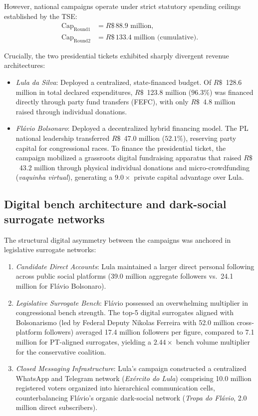 \documentclass[11pt,a4paper]{article}
\begin{document}
However, national campaigns operate under strict statutory spending ceilings established by the TSE:
\begin{align}
    \mathrm{Cap}_{\mathrm{Round1}} &= R\$\,88.9 \text{ million}, \label{eq:spending_cap_r1} \\
    \mathrm{Cap}_{\mathrm{Round2}} &= R\$\,133.4 \text{ million (cumulative)}. \label{eq:spending_cap_r2}
\end{align}

Crucially, the two presidential tickets exhibited sharply divergent revenue architectures:
\begin{itemize}
    \item \emph{Lula da Silva}: Deployed a centralized, state-financed budget. Of $R\$$~128.6 million in total declared expenditures, $R\$$~123.8 million ($96.3\%$) was financed directly through party fund transfers (FEFC), with only $R\$$~4.8 million raised through individual donations.
    \item \emph{Fl{\'a}vio Bolsonaro}: Deployed a decentralized hybrid financing model. The PL national leadership transferred $R\$$~47.0 million ($52.1\%$), reserving party capital for congressional races. To finance the presidential ticket, the campaign mobilized a grassroots digital fundraising apparatus that raised $R\$$~43.2 million through physical individual donations and micro-crowdfunding (\emph{vaquinha virtual}), generating a $9.0\times$ private capital advantage over Lula.
\end{itemize}

\subsection{Digital bench architecture and dark-social surrogate networks}
\label{sssec:digital_bench_details}
The structural digital asymmetry between the campaigns was anchored in legislative surrogate networks:
\begin{enumerate}
    \item \emph{Candidate Direct Accounts}: Lula maintained a larger direct personal following across public social platforms (39.0 million aggregate followers vs.\ 24.1 million for Fl{\'a}vio Bolsonaro).
    \item \emph{Legislative Surrogate Bench}: Fl{\'a}vio possessed an overwhelming multiplier in congressional bench strength. The top-5 digital surrogates aligned with Bolsonarismo (led by Federal Deputy Nikolas Ferreira with 52.0 million cross-platform followers) averaged 17.4 million followers per figure, compared to 7.1 million for PT-aligned surrogates, yielding a $2.44\times$ bench volume multiplier for the conservative coalition.
    \item \emph{Closed Messaging Infrastructure}: Lula's campaign constructed a centralized WhatsApp and Telegram network (\emph{Ex{\'e}rcito do Lula}) comprising 10.0 million registered voters organized into hierarchical communication cells, counterbalancing Fl{\'a}vio's organic dark-social network (\emph{Tropa do Fl{\'a}vio}, 2.0 million direct subscribers).
\end{enumerate}
\end{document}

